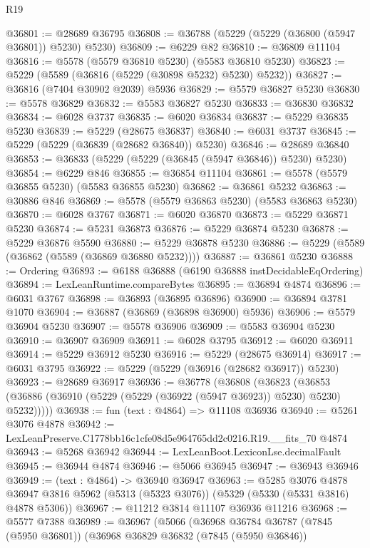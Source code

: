 \begin{lexlean}{R19}
\begin{coremodule}
@36801 := @28689 @36795
@36808 := @36788 (@5229 (@5229 (@36800 (@5947 @36801)) @5230) @5230)
@36809 := @6229 @82
@36810 := @36809 @11104
@36816 := @5578 (@5579 @36810 @5230) (@5583 @36810 @5230)
@36823 := @5229 (@5589 (@36816 (@5229 (@30898 @5232) @5230) @5232))
@36827 := @36816 (@7404 @30902 @2039) @5936
@36829 := @5579 @36827 @5230
@36830 := @5578 @36829
@36832 := @5583 @36827 @5230
@36833 := @36830 @36832
@36834 := @6028 @3737
@36835 := @6020 @36834
@36837 := @5229 @36835 @5230
@36839 := @5229 (@28675 @36837)
@36840 := @6031 @3737
@36845 := @5229 (@5229 (@36839 (@28682 @36840)) @5230)
@36846 := @28689 @36840
@36853 := @36833 (@5229 (@5229 (@36845 (@5947 @36846)) @5230) @5230)
@36854 := @6229 @846
@36855 := @36854 @11104
@36861 := @5578 (@5579 @36855 @5230) (@5583 @36855 @5230)
@36862 := @36861 @5232
@36863 := @30886 @846
@36869 := @5578 (@5579 @36863 @5230) (@5583 @36863 @5230)
@36870 := @6028 @3767
@36871 := @6020 @36870
@36873 := @5229 @36871 @5230
@36874 := @5231 @36873
@36876 := @5229 @36874 @5230
@36878 := @5229 @36876 @5590
@36880 := @5229 @36878 @5230
@36886 := @5229 (@5589 (@36862 (@5589 (@36869 @36880 @5232))))
@36887 := @36861 @5230
@36888 := Ordering
@36893 := @6188 @36888 (@6190 @36888 instDecidableEqOrdering)
@36894 := LexLeanRuntime.compareBytes
@36895 := @36894 @4874
@36896 := @6031 @3767
@36898 := @36893 (@36895 @36896)
@36900 := @36894 @3781 @1070
@36904 := @36887 (@36869 (@36898 @36900) @5936)
@36906 := @5579 @36904 @5230
@36907 := @5578 @36906
@36909 := @5583 @36904 @5230
@36910 := @36907 @36909
@36911 := @6028 @3795
@36912 := @6020 @36911
@36914 := @5229 @36912 @5230
@36916 := @5229 (@28675 @36914)
@36917 := @6031 @3795
@36922 := @5229 (@5229 (@36916 (@28682 @36917)) @5230)
@36923 := @28689 @36917
@36936 := @36778
    (@36808
      (@36823 (@36853 (@36886 (@36910 (@5229 (@5229 (@36922 (@5947 @36923)) @5230) @5230) @5232)))))
@36938 := fun (text : @4864) => @11108 @36936
@36940 := @5261 @3076 @4878
@36942 := LexLeanPreserve.C1778bb16c1cfe08d5e964765dd2c0216.R19.__fits_70 @4874
@36943 := @5268 @36942
@36944 := LexLeanBoot.LexiconLse.decimalFault
@36945 := @36944 @4874
@36946 := @5066 @36945
@36947 := @36943 @36946
@36949 := (text : @4864) -> @36940 @36947
@36963 := @5285
    @3076
    @4878
    @36947
    @3816
    @5962
    (@5313 (@5323 @3076))
    (@5329 (@5330 (@5331 @3816) @4878 @5306))
@36967 := @11212 @3814 @11107 @36936 @11216
@36968 := @5577 @7388
@36989 := @36967
    (@5066
      (@36968
        @36784
        @36787
        (@7845 (@5950 @36801))
        (@36968
          @36829
          @36832
          (@7845 (@5950 @36846))

\end{coremodule}
\end{lexlean}
